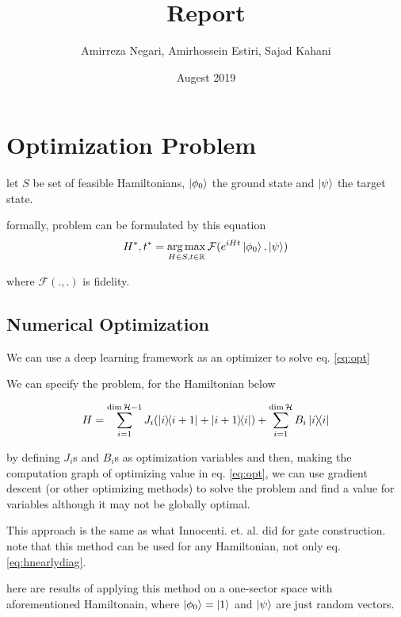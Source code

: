 \documentclass{article}
\title{Report}
\author{Amirreza Negari, Amirhossein Estiri, Sajad Kahani}
\date{Augest 2019}
\DeclareMathOperator*{\argmax}{arg\,max}
\begin{document}
\maketitle

\section{Optimization Problem}
let $S$ be set of feasible Hamiltonians, $\ket{\phi_0}$ the ground state and $\ket{\psi}$ the target state.

formally, problem can be formulated by this equation
\begin{equation} 
\label{eq:opt}
H^*, t^* = \argmax_{H \in S, t \in \mathbb{R}} \mathcal{F}(e^{iHt} \ket{\phi_0}, \ket{\psi})
\end{equation}

where $\mathcal{F}(., .)$ is fidelity.

\subsection{Numerical Optimization}
We can use a deep learning framework as an optimizer to solve eq. \ref{eq:opt}

We can specify the problem, for the Hamiltonian below

\begin{equation} 
\label{eq:hnearlydiag}
H = \sum_{i=1}^{\dim \mathcal{H} - 1} J_i (\dyad{i}{i + 1} + \dyad{i + 1}{i})  + \sum_{i=1}^{\dim \mathcal{H}} B_i \dyad{i}{i} 
\end{equation}

by defining $J_i$s and $B_i$s as optimization variables and then, making the computation graph of optimizing value in eq. \ref{eq:opt}, we can use gradient descent (or other optimizing methods) to solve the problem and find a value for variables although it may not be globally optimal.

This approach is the same as what Innocenti. et. al. did for gate construction. note that this method can be used for any Hamiltonian, not only eq. \ref{eq:hnearlydiag}.

here are results of applying this method on a one-sector space with aforementioned Hamiltonain, where $\ket{\phi_0} = \ket{1}$ and $\ket{\psi}$ are just random vectors.
\end{document}
